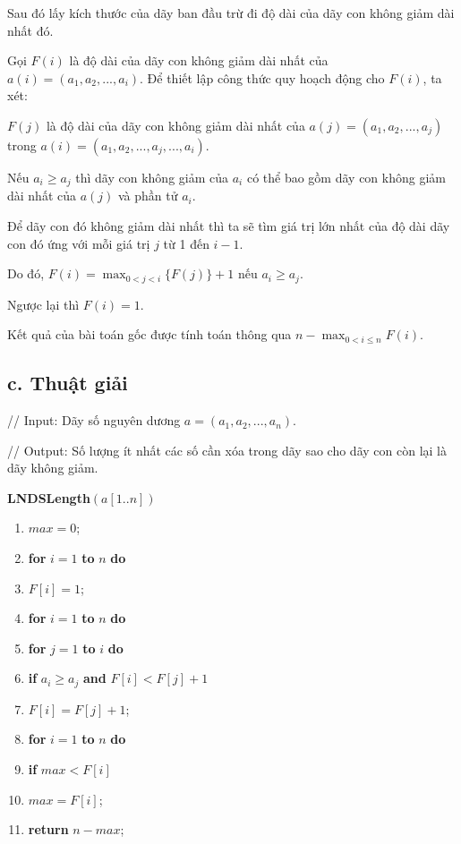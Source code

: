 \documentclass[12pt, a4paper, fleqn]{article}
\begin{document}
	Sau đó lấy kích thước của dãy ban đầu trừ đi độ dài của dãy con không giảm dài nhất đó.
	
	Gọi $F(i)$ là độ dài của dãy con không giảm dài nhất của $a(i) = (a_1, a_2, ..., a_i)$. Để thiết lập công thức quy hoạch động cho $F(i)$, ta xét:
	
	$F(j)$ là độ dài của dãy con không giảm dài nhất của $a(j) = (a_1, a_2, ..., a_j)$ trong $a(i) = (a_1, a_2, ..., a_j, ..., a_i)$.
	
	Nếu $a_i \geq a_j$ thì dãy con không giảm của $a_i$ có thể bao gồm dãy con không giảm dài nhất của $a(j)$ và phần tử $a_i$.
	
	Để dãy con đó không giảm dài nhất thì ta sẽ tìm giá trị lớn nhất của độ dài dãy con đó ứng với mỗi giá trị $j$ từ 1 đến $i - 1$. 
	
	Do đó, $\displaystyle F(i) = \max_{0 < j < i}\{F(j)\} + 1$ nếu $a_i \geq a_j$.
	
	Ngược lại thì $F(i) = 1$.
	
	Kết quả của bài toán gốc được tính toán thông qua $n - \displaystyle \max_{0 < i \leq n} F(i)$.
	
	\subsection*{c. Thuật giải}
	
	// Input: Dãy số nguyên dương $a = (a_1, a_2, ..., a_n)$.
	
	// Output: Số lượng ít nhất các số cần xóa trong dãy sao cho dãy con còn lại là dãy không giảm.
	
	\textbf{LNDSLength}$(a[1..n])$
	\begin{enumerate}
		\item $max = 0$;
		\item \textbf{for} $i = 1$ \textbf{to} $n$ \textbf{do}
		\item \qquad $F[i] = 1$;
		\item \textbf{for} $i = 1$ \textbf{to} $n$ \textbf{do}
		\item \qquad \textbf{for} $j = 1$ \textbf{to} $i$ \textbf{do}
		\item \qquad \qquad \textbf{if} $a_i \geq a_j$ \textbf{and} $F[i] < F[j] + 1$
		\item \qquad \qquad \qquad $F[i] = F[j] + 1$;
		\item \textbf{for} $i = 1$ \textbf{to} $n$ \textbf{do}
		\item \qquad \textbf{if} $max < F[i]$
		\item \qquad \qquad $max = F[i]$;
		\item \textbf{return} $n - max$;
	\end{enumerate}
\end{document}
